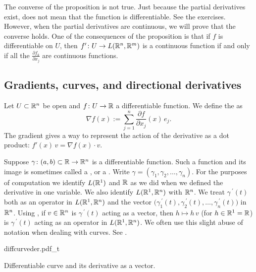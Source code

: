 The converse of the proposition is not true.  Just because the partial
derivatives exist, does not mean that the function is differentiable.  See
the exercises.
However, when the partial derivatives are continuous, we will prove that the
converse holds.
One of the consequences of the proposition is that if $f$
is differentiable on $U$, then $f' \colon U \to
L({\mathbb{R}}^n,{\mathbb{R}}^m)$ is a continuous function if and only if
all the $\frac{\partial f_k}{\partial x_j}$ are continuous functions.

\subsection{Gradients, curves, and directional derivatives}

Let $U \subset {\mathbb{R}}^n$ be open and $f \colon U \to {\mathbb{R}}$ a differentiable
function.  We define
the \emph{} as
\begin{equation*}
\nabla f (x) := \sum_{j=1}^n \frac{\partial f}{\partial x_j} (x)\, e_j .
\end{equation*}
The gradient gives a way to represent the action of
the derivative as a dot product: $f'(x)\,v = \nabla f(x) \cdot v$.

Suppose $\gamma \colon (a,b) \subset {\mathbb{R}} \to {\mathbb{R}}^n$ is a differentiable
function.
Such a function and its image is sometimes called a \emph{},
or a \emph{}.
Write $\gamma =
(\gamma_1,\gamma_2,\ldots,\gamma_n)$.
For the purposes of computation
we identify $L({\mathbb{R}}^1)$ and ${\mathbb{R}}$ as we did when we defined the
derivative in one variable.
We also identify $L({\mathbb{R}}^1,{\mathbb{R}}^n)$ with ${\mathbb{R}}^n$.
We treat $\gamma^{\:\prime}(t)$ both as an operator in
$L({\mathbb{R}}^1,{\mathbb{R}}^n)$ and the vector
$\bigl(\gamma_1^{\:\prime}(t),
\gamma_2^{\:\prime}(t),\ldots,\gamma_n^{\:\prime}(t)\bigr)$
in ${\mathbb{R}}^n$.
Using ,
if $v\in {\mathbb{R}}^n$ is $\gamma^{\:\prime}(t)$ acting as a vector,
then $h \mapsto h \, v$ (for $h \in {\mathbb{R}}^1 = {\mathbb{R}}$) is
$\gamma^{\:\prime}(t)$ acting as an operator
in $L({\mathbb{R}}^1,{\mathbb{R}}^n)$.
We often use this 
slight abuse of notation when dealing with curves.
See .
\begin{myfigureht}
{diffcurveder.pdf_t}
\caption{Differentiable curve and its derivative as a
vector.\label{fig:difcurveder}}
\end{myfigureht}


